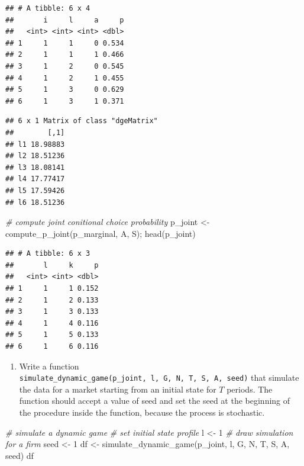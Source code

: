 \documentclass[
]{book}
\newenvironment{Shaded}{\begin{snugshade}}{\end{snugshade}}
\newcommand{\CommentTok}[1]{\textcolor[rgb]{0.56,0.35,0.01}{\textit{#1}}}
\newcommand{\DecValTok}[1]{\textcolor[rgb]{0.00,0.00,0.81}{#1}}
\newcommand{\FunctionTok}[1]{\textcolor[rgb]{0.00,0.00,0.00}{#1}}
\newcommand{\NormalTok}[1]{#1}
\newcommand{\OtherTok}[1]{\textcolor[rgb]{0.56,0.35,0.01}{#1}}
\newcommand{\SpecialCharTok}[1]{\textcolor[rgb]{0.00,0.00,0.00}{#1}}
\providecommand{\tightlist}{%
  \setlength{\itemsep}{0pt}\setlength{\parskip}{0pt}}
\begin{document}
\begin{verbatim}
## # A tibble: 6 x 4
##       i     l     a     p
##   <int> <int> <int> <dbl>
## 1     1     1     0 0.534
## 2     1     1     1 0.466
## 3     1     2     0 0.545
## 4     1     2     1 0.455
## 5     1     3     0 0.629
## 6     1     3     1 0.371
\end{verbatim}

\begin{Shaded}
\end{Shaded}

\begin{verbatim}
## 6 x 1 Matrix of class "dgeMatrix"
##        [,1]
## l1 18.98883
## l2 18.51236
## l3 18.08141
## l4 17.77417
## l5 17.59426
## l6 18.51236
\end{verbatim}

\begin{Shaded}
\begin{Highlighting}[]
\CommentTok{\# compute joint conitional choice probability}
\NormalTok{p\_joint }\OtherTok{\textless{}{-}} \FunctionTok{compute\_p\_joint}\NormalTok{(p\_marginal, A, S); }\FunctionTok{head}\NormalTok{(p\_joint)}
\end{Highlighting}
\end{Shaded}

\begin{verbatim}
## # A tibble: 6 x 3
##       l     k     p
##   <int> <int> <dbl>
## 1     1     1 0.152
## 2     1     2 0.133
## 3     1     3 0.133
## 4     1     4 0.116
## 5     1     5 0.133
## 6     1     6 0.116
\end{verbatim}

\begin{enumerate}
\def\labelenumi{\arabic{enumi}.}
\setcounter{enumi}{11}
\tightlist
\item
  Write a function \texttt{simulate\_dynamic\_game(p\_joint,\ l,\ G,\ N,\ T,\ S,\ A,\ seed)} that simulate the data for a market starting from an initial state for \(T\) periods. The function should accept a value of seed and set the seed at the beginning of the procedure inside the function, because the process is stochastic.
\end{enumerate}

\begin{Shaded}
\begin{Highlighting}[]
\CommentTok{\# simulate a dynamic game}
\CommentTok{\# set initial state profile}
\NormalTok{l }\OtherTok{\textless{}{-}} \DecValTok{1}
\CommentTok{\# draw simulation for a firm}
\NormalTok{seed }\OtherTok{\textless{}{-}} \DecValTok{1}
\NormalTok{df }\OtherTok{\textless{}{-}} \FunctionTok{simulate\_dynamic\_game}\NormalTok{(p\_joint, l, G, N, T, S, A, seed)}
\NormalTok{df}
\end{Highlighting}
\end{Shaded}
\end{document}
